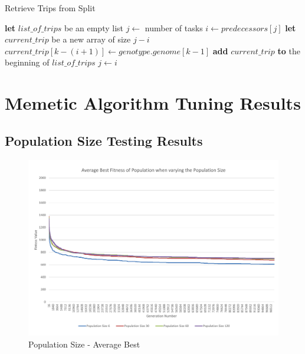 \begin{algorithm}[H]
\caption{Retrieve Trips from Split}\label{split-retrieve-pseudocode}
\begin{algorithmic}[1]

	\State \textbf{let} $list\_of\_trips$ be an empty list
	\State $j \leftarrow$ number of tasks
	\DoWhile
		\State $i \leftarrow predecessors[j]$
		\State \textbf{let} $current\_trip$ be a new array of size $j - i$
			\State $current\_trip[k-(i+1)] \leftarrow genotype.genome[k-1]$
		\EndFor
		\State \textbf{add} $current\_trip$ \textbf{to} the beginning of $list\_of\_trips$
		\State $j \leftarrow i$
\EndProcedure

\end{algorithmic}
\end{algorithm}



\chapter{Memetic Algorithm Tuning Results} %
\label{cha:memetic_algorithm_tunin_results}

\section{Population Size Testing Results} %
\label{sec:population_size_testing_results}

\begin{landscape}
\begin{figure}[thbp]
	\centerline{\includegraphics[height=0.945\textwidth]{figures/CircleTests/PopulationSize/CircleTestsPopulationAverageBest.pdf}}
	\caption{Population Size - Average Best}
	\label{fig:ctpab}
\end{figure}
\end{landscape}

